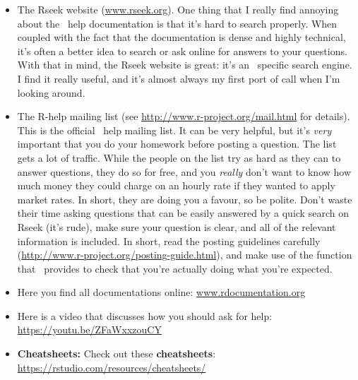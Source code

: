 \begin{itemize}
	\item The Rseek website (\url{www.rseek.org}). One thing that I really find annoying about the \R\ help documentation is that it's hard to search properly. When coupled with the fact that the documentation is dense and highly technical, it's often a better idea to search or ask online for answers to your questions. With that in mind, the Rseek website is great: it's an \R\ specific search engine. I find it really useful, and it's almost always my first port of call when I'm looking around.
	\item The R-help mailing list (see \url{http://www.r-project.org/mail.html} for details). This is the official \R\ help mailing list. It can be very helpful, but it's {\it very} important that you do your homework before posting a question. The list gets a lot of traffic. While the people on the list try as hard as they can to answer questions, they do so for free, and you {\it really} don't want to know how much money they could charge on an hourly rate if they wanted to apply market rates. In short, they are doing you a favour, so be polite. Don't waste their time asking questions that can be easily answered by a quick search on Rseek (it's rude), make sure your question is clear, and all of the relevant information is included. In short, read the posting guidelines carefully (\url{http://www.r-project.org/posting-guide.html}), and make use of the  function that \R\ provides to check that you're actually doing what you're expected.
	\item Here you find all documentations online: \websmall\url{www.rdocumentation.org}
	\item Here is a video that discusses how you should ask for help: \websmall\url{https://youtu.be/ZFaWxxzouCY}
	\item \textbf{Cheatsheets:} Check out these \textbf{cheatsheets}: \websmall\url{https://rstudio.com/resources/cheatsheets/}
\end{itemize}


